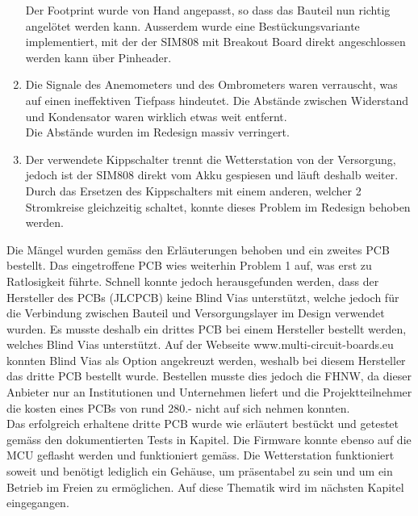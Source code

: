 \begin{enumerate}
Der Footprint wurde von Hand angepasst, so dass das Bauteil nun richtig angelötet werden kann. Ausserdem wurde eine Bestückungsvariante implementiert, mit der der SIM808 mit Breakout Board direkt angeschlossen werden kann über Pinheader.
\item Die Signale des Anemometers und des Ombrometers waren verrauscht, was auf einen ineffektiven Tiefpass hindeutet. Die Abstände zwischen Widerstand und Kondensator waren wirklich etwas weit entfernt.\\
Die Abstände wurden im Redesign massiv verringert.
\item Der verwendete Kippschalter trennt die Wetterstation von der Versorgung, jedoch ist der SIM808 direkt vom Akku gespiesen und läuft deshalb weiter.\\
Durch das Ersetzen des Kippschalters mit einem anderen, welcher 2 Stromkreise gleichzeitig schaltet, konnte dieses Problem im Redesign behoben werden.
\end{enumerate}
Die Mängel wurden gemäss den Erläuterungen behoben und ein zweites PCB bestellt. Das eingetroffene PCB wies weiterhin Problem 1 auf, was erst zu Ratlosigkeit führte. Schnell konnte jedoch herausgefunden werden, dass der Hersteller des PCBs (JLCPCB) keine Blind Vias unterstützt, welche jedoch für die Verbindung zwischen Bauteil und Versorgungslayer im Design verwendet wurden. Es musste deshalb ein drittes PCB bei einem Hersteller bestellt werden, welches Blind Vias unterstützt. Auf der Webseite www.multi-circuit-boards.eu konnten Blind Vias als Option angekreuzt werden, weshalb bei diesem Hersteller das dritte PCB bestellt wurde. Bestellen musste dies jedoch die FHNW, da dieser Anbieter nur an Institutionen und Unternehmen liefert und die Projektteilnehmer die kosten eines PCBs von rund 280.- nicht auf sich nehmen konnten. \\[0.5cm]
Das erfolgreich erhaltene dritte PCB wurde wie erläutert bestückt und getestet gemäss den dokumentierten Tests in Kapitel.  Die Firmware konnte ebenso auf die MCU geflasht werden und funktioniert gemäss.  Die Wetterstation funktioniert soweit und benötigt lediglich ein Gehäuse, um präsentabel zu sein und um ein Betrieb im Freien zu ermöglichen. Auf diese Thematik wird im nächsten Kapitel eingegangen.